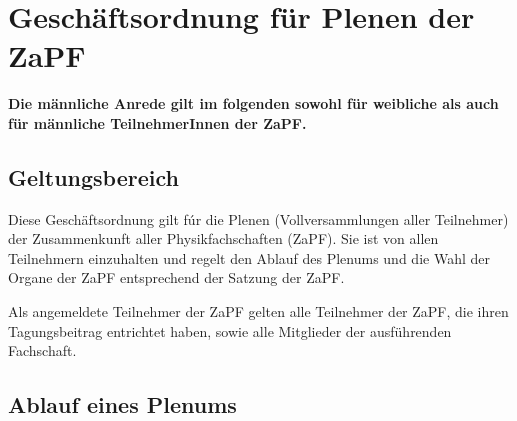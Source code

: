 \documentclass[draft,12pt,oneside]{scrreprt}
\begin{document}
\chapter*{Geschäftsordnung für Plenen der ZaPF}

\textbf{Die männliche Anrede gilt im folgenden sowohl für weibliche als auch für
männliche TeilnehmerInnen der ZaPF.}

\section{Geltungsbereich}

Diese Geschäftsordnung gilt fúr die Plenen (Vollversammlungen aller Teilnehmer)
der Zusammenkunft aller Physikfachschaften (ZaPF).
Sie ist von allen Teilnehmern einzuhalten und regelt den Ablauf des Plenums und
die Wahl der Organe der ZaPF entsprechend der Satzung der ZaPF.

Als angemeldete Teilnehmer der ZaPF gelten alle Teilnehmer der ZaPF, die ihren
Tagungsbeitrag entrichtet haben, sowie alle Mitglieder der ausführenden Fachschaft.

\section{Ablauf eines Plenums}
\end{document}

